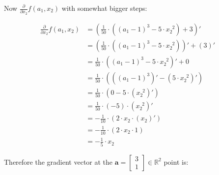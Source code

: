 \documentclass[titlepage]{article}
\begin{document}
            Now $\frac{\partial}{\partial x_2} f(a_1, x_2)$ with somewhat bigger
            steps:

            \begin{align*}
              \frac{\partial}{\partial x_2} f(a_1, x_2)
                & = \left(
                      \frac{1}{50}
                      \cdot
                      \left( (a_1 - 1)^3 - 5 \cdot x_2^{\enspace 2} \right) + 3
                    \right)' \\
                & = \left(
                      \frac{1}{50}
                      \cdot
                      \left( (a_1 - 1)^3 - 5 \cdot x_2^{\enspace 2} \right)
                    \right)'
                    +
                    (3)' \\
                & = \frac{1}{50}
                    \cdot
                    \left( (a_1 - 1)^3 - 5 \cdot x_2^{\enspace 2} \right)'
                    +
                    0 \\
                & = \frac{1}{50}
                    \cdot
                    \left(
                      \left(
                        (a_1 - 1)^3 \right)'
                        - \left(5 \cdot x_2^{\enspace 2} \right)'
                    \right) \\
                & = \frac{1}{50}
                    \cdot
                    \left(
                      0 - 5 \cdot \left( x_2^{\enspace 2} \right)'
                    \right) \\
                & = \frac{1}{50}
                    \cdot
                    (-5)
                    \cdot
                    \left( x_2^{\enspace 2} \right)' \\
                & = - \frac{1}{10}
                    \cdot
                    \left( 2 \cdot x_2 \cdot \left( x_2 \right)' \right) \\
                & = - \frac{1}{10}
                    \cdot
                    \left( 2 \cdot x_2 \cdot 1 \right) \\
                & = - \frac{1}{5} \cdot x_2
            \end{align*}

            Therefore the gradient vector at the
            $\mathbf{a} = \begin{bmatrix}3 \\ 1\end{bmatrix} \in \mathbb{R}^2$
            point is:
\end{document}
